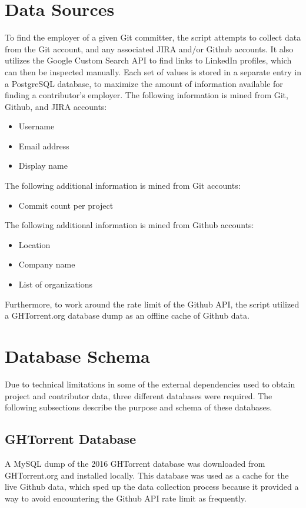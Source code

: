 \section{Data Sources}

To find the employer of a given Git committer, the script attempts to collect data from the Git account, and any associated JIRA and/or Github accounts. It also utilizes the Google Custom Search API to find links to LinkedIn profiles, which can then be inspected manually. Each set of values is stored in a separate entry in a PostgreSQL database, to maximize the amount of information available for finding a contributor's employer.
The following information is mined from Git, Github, and JIRA accounts:
\begin{itemize}
	\item Username
	\item Email address
	\item Display name
\end{itemize}
The following additional information is mined from Git accounts:
\begin{itemize}
	\item Commit count per project
\end{itemize}
The following additional information is mined from Github accounts:
\begin{itemize}
	\item Location
	\item Company name
	\item List of organizations
\end{itemize}
Furthermore, to work around the rate limit of the Github API, the script utilized a GHTorrent.org database dump as an offline cache of Github data.


\section{Database Schema}
Due to technical limitations in some of the external dependencies used to obtain project and contributor data, three different databases were required. The following subsections describe the purpose and schema of these databases.
\subsection{GHTorrent Database}
A MySQL dump of the 2016 GHTorrent database was downloaded from GHTorrent.org and installed locally. This database was used as a cache for the live Github data, which sped up the data collection process because it provided a way to avoid encountering the Github API rate limit as frequently.
